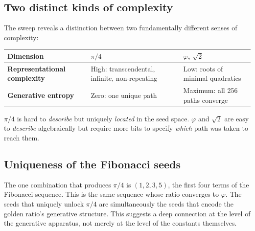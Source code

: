 \documentclass[12pt]{article}
\begin{document}
\subsection{Two distinct kinds of complexity}\label{two-distinct-kinds-of-complexity}

The sweep reveals a distinction between two fundamentally different
senses of complexity:

\begin{longtable}[]{@{}
  >{\raggedright\arraybackslash}p{}
  >{\raggedright\arraybackslash}p{}
  >{\raggedright\arraybackslash}p{}@{}}
\toprule\noalign{}
\begin{minipage}[b]{\linewidth}\raggedright
Dimension
\end{minipage} & \begin{minipage}[b]{\linewidth}\raggedright
\(\pi/4\)
\end{minipage} & \begin{minipage}[b]{\linewidth}\raggedright
\(\varphi\), \(\sqrt{2}\)
\end{minipage} \\
\midrule\noalign{}
\endhead
\bottomrule\noalign{}
\endlastfoot
\textbf{Representational complexity} & High: transcendental, infinite,
non-repeating & Low: roots of minimal quadratics \\
\textbf{Generative entropy} & Zero: one unique path & Maximum: all 256
paths converge \\
\end{longtable}

\(\pi/4\) is hard to \emph{describe} but uniquely \emph{located} in the
seed space. \(\varphi\) and \(\sqrt{2}\) are easy to \emph{describe}
algebraically but require more bits to specify \emph{which} path was
taken to reach them.

\subsection{Uniqueness of the Fibonacci seeds}\label{uniqueness-of-the-fibonacci-seeds}

The one combination that produces \(\pi/4\) is \((1, 2, 3, 5)\), the
first four terms of the Fibonacci sequence. This is the same sequence
whose ratio converges to \(\varphi\). The seeds that uniquely unlock
\(\pi/4\) are simultaneously the seeds that encode the golden ratio's
generative structure. This suggests a deep connection at the level of
the generative apparatus, not merely at the level of the constants
themselves.
\end{document}
